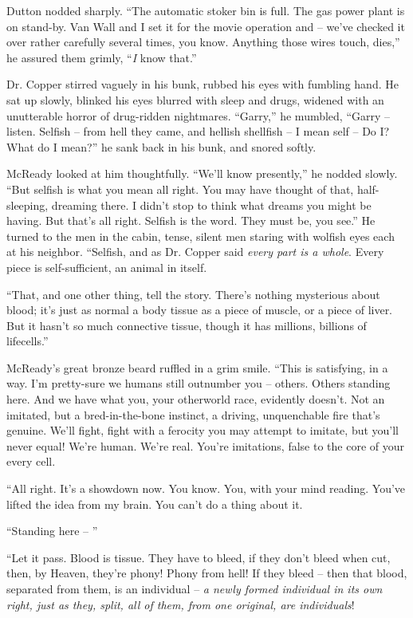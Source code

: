 \documentclass[letterpaper,openany,12pt]{memoir}		%
\begin{document}
Dutton nodded sharply. ``The automatic stoker bin is full. The gas power plant
is on stand-by. Van Wall and I set it for the movie operation and -- we've
checked it over rather carefully several times, you know. Anything those wires
touch, dies,'' he assured them grimly, ``\emph{I} know that.''

Dr. Copper stirred vaguely in his bunk, rubbed his eyes with fumbling hand. He
sat up slowly, blinked his eyes blurred with sleep and drugs, widened with an
unutterable horror of drug-ridden nightmares. ``Garry,'' he mumbled, ``Garry --
listen. Selfish -- from hell they came, and hellish shellfish -- I mean self -- Do
I? What do I mean?'' he sank back in his bunk, and snored softly.

McReady looked at him thoughtfully. ``We'll know presently,'' he nodded slowly.
``But selfish is what you mean all right. You may have thought of that,
half-sleeping, dreaming there. I didn't stop to think what dreams you might be
having. But that's all right. Selfish is the word. They must be, you see.'' He
turned to the men in the cabin, tense, silent men staring with wolfish eyes each
at his neighbor. ``Selfish, and as Dr. Copper said \emph{every part is a whole}.
Every piece is self-sufficient, an animal in itself.

``That, and one other thing, tell the story. There's nothing mysterious about
blood; it's just as normal a body tissue as a piece of muscle, or a piece of
liver. But it hasn't so much connective tissue, though it has millions, billions
of lifecells.''

McReady's great bronze beard ruffled in a grim smile. ``This is satisfying, in a
way. I'm pretty-sure we humans still outnumber you -- others. Others standing
here. And we have what you, your otherworld race, evidently doesn't. Not an
imitated, but a bred-in-the-bone instinct, a driving, unquenchable fire that's
genuine. We'll fight, fight with a ferocity you may attempt to imitate, but
you'll never equal! We're human. We're real. You're imitations, false to the
core of your every cell.

``All right. It's a showdown now. You know. You, with your mind reading. You've
lifted the idea from my brain. You can't do a thing about it.

``Standing here -- ''

``Let it pass. Blood is tissue. They have to bleed, if they don't bleed when
cut, then, by Heaven, they're phony! Phony from hell! If they bleed -- then that
blood, separated from them, is an individual -- \emph{a newly formed individual
in its own right, just as they, split, all of them, from one original, are
individuals}!
\end{document}
